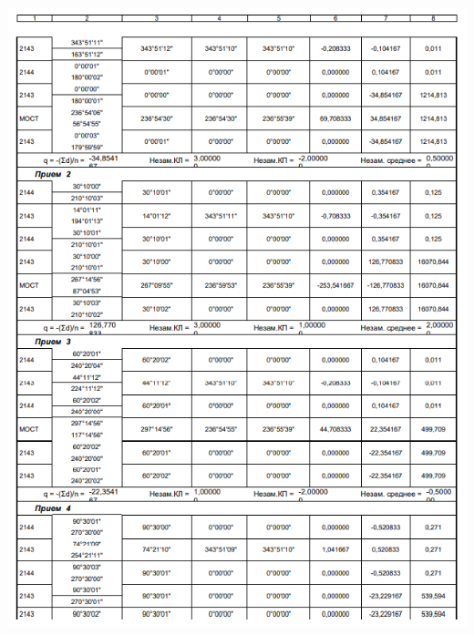 \documentclass[a4paper]{article}
\begin{document}
\begin{newpage}
\begin{center}
        \includegraphics[scale=1.4]{vedomosty/скп2.png}

\end{center}
\end{newpage}
\end{document}
